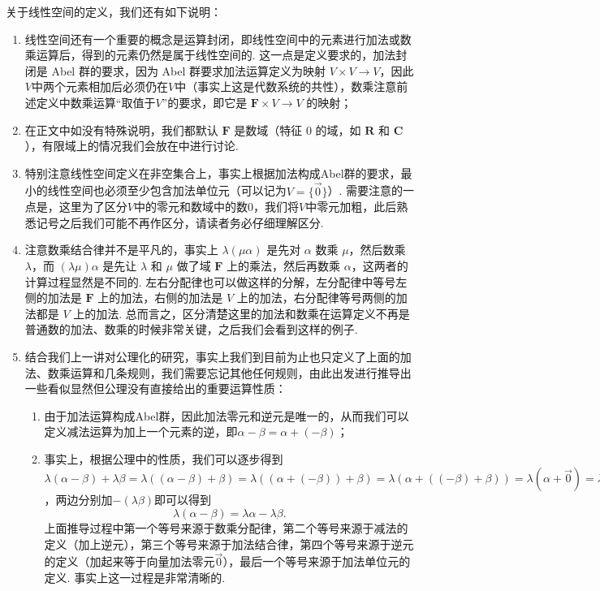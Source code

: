 关于线性空间的定义，我们还有如下说明：
\begin{enumerate}
    \item 线性空间还有一个重要的概念是运算封闭，即线性空间中的元素进行加法或数乘运算后，得到的元素仍然是属于线性空间的. 这一点是定义要求的，加法封闭是 Abel 群的要求，因为 Abel 群要求加法运算定义为映射 $V\times V\to V$，因此$V$中两个元素相加后必须仍在$V$中（事实上这是代数系统的共性），数乘注意前述定义中数乘运算``取值于$V$''的要求，即它是 $\mathbf{F}\times V\to V$ 的映射；

    \item 在正文中如没有特殊说明，我们都默认 $\mathbf{F}$ 是数域（特征 $0$ 的域，如 $\mathbf{R}$ 和 $\mathbf{C}$），有限域上的情况我们会放在中进行讨论.

    \item 特别注意线性空间定义在非空集合上，事实上根据加法构成Abel群的要求，最小的线性空间也必须至少包含加法单位元（可以记为$V=\{\vec{0}\}$）. 需要注意的一点是，这里为了区分$V$中的零元和数域中的数0，我们将$V$中零元加粗，此后熟悉记号之后我们可能不再作区分，请读者务必仔细理解区分.

    \item 注意数乘结合律并不是平凡的，事实上 $\lambda(\mu\alpha)$ 是先对 $\alpha$ 数乘 $\mu$，然后数乘 $\lambda$，而 $(\lambda\mu)\alpha$ 是先让 $\lambda$ 和 $\mu$ 做了域 $\mathbf{F}$ 上的乘法，然后再数乘 $\alpha$，这两者的计算过程显然是不同的. 左右分配律也可以做这样的分解，左分配律中等号左侧的加法是 $\mathbf{F}$ 上的加法，右侧的加法是 $V$ 上的加法，右分配律等号两侧的加法都是 $V$ 上的加法. 总而言之，区分清楚这里的加法和数乘在运算定义不再是普通数的加法、数乘的时候非常关键，之后我们会看到这样的例子.

    \item 结合我们上一讲对公理化的研究，事实上我们到目前为止也只定义了上面的加法、数乘运算和几条规则，我们需要忘记其他任何规则，由此出发进行推导出一些看似显然但公理没有直接给出的重要运算性质：
          \begin{enumerate}
              \item 由于加法运算构成Abel群，因此加法零元和逆元是唯一的，从而我们可以定义减法运算为加上一个元素的逆，即$\alpha-\beta=\alpha+(-\beta)$；

              \item 事实上，根据公理中的性质，我们可以逐步得到$\lambda(\alpha-\beta)+\lambda\beta=\lambda((\alpha-\beta)+\beta)=\lambda((\alpha+(-\beta))+\beta)=\lambda(\alpha+((-\beta)+\beta))=\lambda(\alpha+\vec{0})=\lambda\alpha$，两边分别加$-(\lambda\beta)$即可以得到
                    \begin{equation}\label{eq:2:线性空间运算性质1}
                        \lambda(\alpha-\beta)=\lambda\alpha-\lambda\beta.
                    \end{equation}
                    上面推导过程中第一个等号来源于数乘分配律，第二个等号来源于减法的定义（加上逆元），第三个等号来源于加法结合律，第四个等号来源于逆元的定义（加起来等于向量加法零元$\vec{0}$），最后一个等号来源于加法单位元的定义. 事实上这一过程是非常清晰的.


\end{enumerate}
\end{enumerate}

